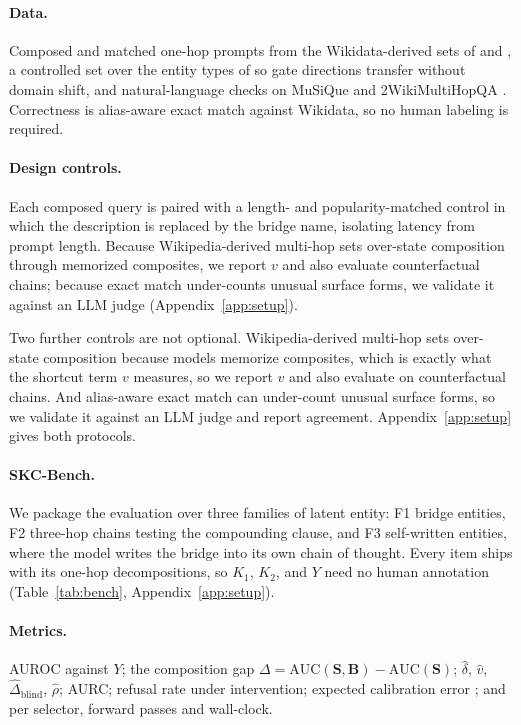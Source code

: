 \documentclass{article}
\newcommand{\gate}{\mathbf{S}}
\newcommand{\bridge}{\mathbf{B}}
\begin{document}
\paragraph{Data.} Composed and matched one-hop prompts from the Wikidata-derived sets of
\citet{yang2024latent} and \citet{biran2024hopping}, a controlled set over the entity types of
\citet{ferrando2025entity} so gate directions transfer without domain shift, and natural-language
checks on MuSiQue \citep{trivedi2022musique} and 2WikiMultiHopQA \citep{ho2020constructing}.
Correctness is alias-aware exact match against Wikidata, so no human labeling is required.

\paragraph{Design controls.} Each composed query is paired with a length- and popularity-matched
control in which the description is replaced by the bridge name, isolating latency from prompt
length. Because Wikipedia-derived multi-hop sets over-state composition through memorized
composites, we report $v$ and also evaluate counterfactual chains; because exact match under-counts
unusual surface forms, we validate it against an {LLM} judge \citep{zheng2023judge}
(Appendix~\ref{app:setup}).

Two further controls are not optional. Wikipedia-derived multi-hop sets over-state composition
because models memorize composites, which is exactly what the shortcut term $v$ measures, so we
report $v$ and also evaluate on counterfactual chains. And alias-aware exact match can under-count
unusual surface forms, so we validate it against an {LLM} judge \citep{zheng2023judge} and report
agreement. Appendix~\ref{app:setup} gives both protocols.

\paragraph{SKC-Bench.}
\label{sec:bench}
We package the evaluation over three families of latent entity: F1 bridge entities, F2 three-hop
chains testing the compounding clause, and F3 self-written entities, where the model writes the
bridge into its own chain of thought. Every item ships with its one-hop decompositions, so $K_1$,
$K_2$, and $Y$ need no human annotation (Table~\ref{tab:bench}, Appendix~\ref{app:setup}).

\paragraph{Metrics.} AUROC against $Y$; the composition gap
$\Delta=\mathrm{AUC}(\gate,\bridge)-\mathrm{AUC}(\gate)$; $\hat\delta$, $\hat v$,
$\hat\Delta_{\mathrm{blind}}$, $\hat\rho$; AURC; refusal rate under intervention; expected
calibration error \citep{guo2017calibration}; and per selector, forward passes and wall-clock.
\end{document}
